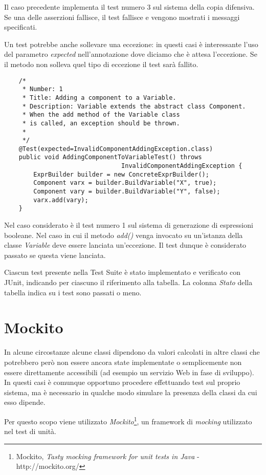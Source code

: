 Il caso precedente implementa il test numero 3 sul sistema della copia difensiva. Se una delle asserzioni fallisce, il test fallisce e vengono mostrati i messaggi specificati.

Un test potrebbe anche sollevare una eccezione: in questi casi è interessante l'uso del parametro \emph{expected} nell'annotazione dove diciamo che è attesa l'eccezione. Se il metodo non solleva quel tipo di eccezione il test sarà fallito.

\begin{lstlisting}
	/*
	 * Number: 1
	 * Title: Adding a component to a Variable.
	 * Description: Variable extends the abstract class Component. 
	 * When the add method of the Variable class 
	 * is called, an exception should be thrown.
	 * 
	 */
	@Test(expected=InvalidComponentAddingException.class)
	public void AddingComponentToVariableTest() throws 
								InvalidComponentAddingException {		
		ExprBuilder builder = new ConcreteExprBuilder();
		Component varx = builder.BuildVariable("X", true);
		Component vary = builder.BuildVariable("Y", false);
		varx.add(vary);
	}
\end{lstlisting}

Nel caso considerato è il test numero 1 sul sistema di generazione di espressioni booleane. Nel caso in cui il metodo \emph{add()} venga invocato su un'istanza della classe \emph{Variable} deve essere lanciata un'eccezione. Il test dunque è considerato passato se questa viene lanciata. 

Ciascun test presente nella Test Suite è stato implementato e verificato con JUnit, indicando per ciascuno il riferimento alla tabella. La colonna \emph{Stato} della tabella indica su i test sono passati o meno.

\section{Mockito}

In alcune circostanze alcune classi dipendono da valori calcolati in altre classi che potrebbero però non essere ancora state implementate o semplicemente non essere direttamente accessibili (ad esempio un servizio Web in fase di sviluppo). In questi casi è comunque opportuno procedere effettuando test sul proprio sistema, ma è necessario in qualche modo simulare la presenza della classi da cui esso dipende.

Per questo scopo viene utilizzato \emph{Mockito}\footnote{Mockito, \emph{Tasty mocking framework for unit tests in Java} - http://mockito.org/}, un framework di \emph{mocking} utilizzato nel test di unità.

